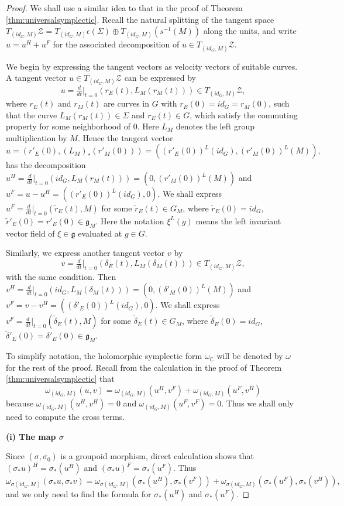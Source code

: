 \documentclass[a4paper,12pt,leqno]{amsart}
\numberwithin{equation}{section}
\theoremstyle{plain}
\theoremstyle{definition}
\newcommand{\cZ}{\mathcal{Z}}
\newcommand{\bC}{\mathbb{C}}
\newcommand{\fg}{\mathfrak{g}}
\begin{document}
\begin{proof}
We shall use a similar idea to that in the proof of Theorem \ref{thm:universalsymplectic}. Recall the natural splitting of the tangent space $T_{(id_G,M)}\cZ=T_{(id_G,M)}\epsilon(\Sigma)\oplus T_{(id_G,M)}(s^{-1}(M))$ along the units, and write $u=u^H+u^F$ for the associated decomposition of $u\in T_{(id_G,M)}\cZ$.

We begin by expressing the tangent vectors as velocity vectors of suitable curves.
A tangent vector $u\in T_{(id_G,M)}\cZ$ can be expressed by
$$u=\tfrac{d}{dt}|_{t=0}(r_E(t),L_M(r_M(t)))\in T_{(id_G,M)}\cZ,$$
where $r_E(t)$ and $r_M(t)$ are curves in $G$ with $r_E(0)=id_G=r_M(0)$, such that the curve $L_M(r_M(t))\in\Sigma$ and $r_E(t)\in G$, which satisfy the commuting property for some neighborhood of $0$. Here $L_M$ denotes the left group multiplication by $M$. Hence the tangent vector
$$u=(r'_E(0),(L_M)_*(r'_M(0)) )=( (r'_E(0))^L(id_G), (r'_M(0))^L(M) ),$$
has the decomposition $u^H=\frac{d}{dt}|_{t=0}(id_G,L_M(r_M(t)))=(0,(r'_M(0))^L(M))$ and $u^F=u-u^H=( (r'_E(0))^L(id_G),0 )$. We shall express $u^F=\frac{d}{dt}|_{t=0}(\tilde{r}_E(t),M)$ for some $\tilde{r}_E(t)\in G_M$, where $\tilde{r}_E(0)=id_G$, $\tilde{r}'_E(0)=r'_E(0) \in \fg_M$.
Here the notation $\xi^L(g)$ means the left invariant vector field of $\xi\in\fg$ evaluated at $g\in G$.

Similarly, we express another tangent vector $v$ by
$$v=\tfrac{d}{dt}|_{t=0}(\delta_E(t),L_M(\delta_M(t)))\in T_{(id_G,M)}\cZ,$$ with the same condition.
Then $v^H=\frac{d}{dt}|_{t=0}(id_G,L_M(\delta_M(t)))=(0,(\delta'_M(0))^L(M))$ and $v^F=v-v^H=( (\delta'_E(0))^L(id_G),0 )$. We shall express $v^F=\frac{d}{dt}|_{t=0}(\tilde{\delta}_E(t),M)$ for some $\tilde{\delta}_E(t)\in G_M$, where $\tilde{\delta}_E(0)=id_G$, $\tilde{\delta}'_E(0)=\delta'_E(0) \in \fg_M$.

To simplify notation, the holomorphic symplectic form $\omega_\bC$ will be denoted by $\omega$ for the rest of the proof. Recall from the calculation in the proof of Theorem \ref{thm:universalsymplectic} that
$$\omega_{(id_G,M)}(u,v)=\omega_{(id_G,M)}(u^H,v^F)+\omega_{(id_G,M)}(u^F,v^H)$$
because $\omega_{(id_G,M)}(u^H,v^H)=0$ and $\omega_{(id_G,M)}(u^F,v^F)=0$. Thus we shall only need to compute the cross terms.

{\bf (i) The map $\sigma$}

Since $(\sigma,\sigma_0)$ is a groupoid morphism, direct calculation shows that $(\sigma_*u)^H=\sigma_*(u^H)$ and $(\sigma_*u)^F=\sigma_*(u^F)$. 
Thus $\omega_{\sigma(id_G,M)}(\sigma_*u,\sigma_*v)=\omega_{\sigma(id_G,M)}(\sigma_*(u^H),\sigma_*(v^F))
+\omega_{\sigma(id_G,M)}(\sigma_*(u^F),\sigma_*(v^H)),$  and  we only need to find the formula for $\sigma_*(u^H)$ and $\sigma_*(u^F)$.


\end{proof}
\end{document}
